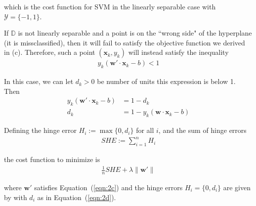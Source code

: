 \documentclass[12pt]{article}
\begin{document}
\begin{enumerate}
which is the cost function for SVM in the linearly separable case with $\mathcal{Y}=\{-1, 1\}$.


If $\mathbb{D}$ is not linearly separable and a point is on the ``wrong side" of the hyperplane
(it is missclassified), then it will fail to satisfy the objective function we derived
in (c). Therefore, such a point $(\mathbf{x}_k, y_k)$ will instead satisfy the inequality
\begin{align*}
	y_k(\mathbf{w}'\cdot \mathbf{x}_k-b)<1
\end{align*}

In this case, we can let $d_k>0$ be number of units this expression is below 1. Then
\begin{align}
	y_k(\mathbf{w}'\cdot \mathbf{x}_k-b)&=1-d_k\nonumber\\
	d_k &= 1 - y_k(\mathbf{w}\cdot \mathbf{x}_k-b)\label{eqn:2d}
\end{align}

Defining the hinge error $H_i:=\max \{0, d_i\}$ for all $i$, and the sum of hinge errors
\begin{align*}
	SHE := \sum_{i=1}^{n}H_i
\end{align*}

the cost function to minimize is
\begin{align*}
	\frac{1}{n} SHE + \lambda \|\mathbf{w}'\|
\end{align*}

where $\mathbf{w}'$ satisfies Equation~(\ref{eqn:2c}) and the hinge errors $H_i=\{0, d_i\}$
are given by with $d_i$ as in Equation~(\ref{eqn:2d}).

\end{enumerate}



\end{document}
